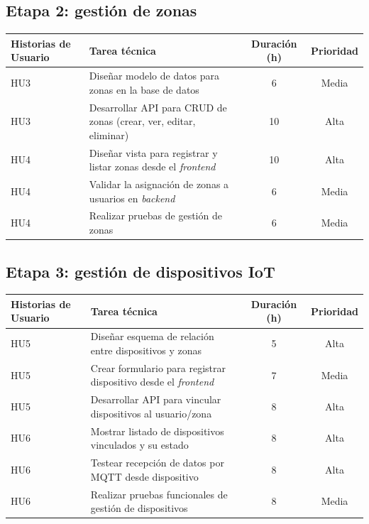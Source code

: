 \documentclass[
11pt, %
]{charter}
\begin{document}
\subsection*{Etapa 2: gestión de zonas}
\begin{tabular}{|p{2.5cm}|p{7.5cm}|c|c|}
\hline
\textbf{Historias de Usuario} & \textbf{Tarea técnica} & \textbf{Duración (h)} & \textbf{Prioridad} \\
\hline
HU3 & Diseñar modelo de datos para zonas en la base de datos & 6 & Media \\
\hline
HU3 & Desarrollar API para CRUD de zonas (crear, ver, editar, eliminar) & 10 & Alta \\
\hline
HU4 & Diseñar vista para registrar y listar zonas desde el \textit{frontend} & 10 & Alta \\
\hline
HU4 & Validar la asignación de zonas a usuarios en \textit{backend} & 6 & Media \\
\hline
HU4 & Realizar pruebas de gestión de zonas & 6 & Media \\
\hline
\end{tabular}

\subsection*{Etapa 3: gestión de dispositivos IoT}
\begin{tabular}{|p{2.5cm}|p{7.5cm}|c|c|}
\hline
\textbf{Historias de Usuario} & \textbf{Tarea técnica} & \textbf{Duración (h)} & \textbf{Prioridad} \\
\hline
HU5 & Diseñar esquema de relación entre dispositivos y zonas & 5 & Alta \\
\hline
HU5 & Crear formulario para registrar dispositivo desde el \textit{frontend} & 7 & Media \\
\hline
HU5 & Desarrollar API para vincular dispositivos al usuario/zona & 8 & Alta \\
\hline
HU6 & Mostrar listado de dispositivos vinculados y su estado & 8 & Alta \\
\hline
HU6 & Testear recepción de datos por MQTT desde dispositivo & 8 & Alta \\
\hline
HU6 & Realizar pruebas funcionales de gestión de dispositivos & 8 & Media \\
\hline
\end{tabular}
\end{document}
